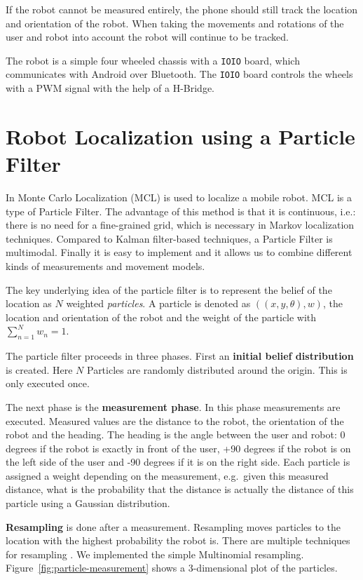 \documentclass[journal]{IEEEtran}
\begin{document}
If the robot cannot be measured entirely, the phone should still track the
location and orientation of the robot. When taking the movements and
rotations of the user and robot into account the robot will continue to be
tracked.

The robot is a simple four wheeled chassis with a \texttt{IOIO} board,
which communicates with Android over Bluetooth. The \texttt{IOIO} board
controls the wheels with a PWM signal with the help of a H-Bridge.

\section{Robot Localization using a Particle Filter}

In \cite{fox1999monte} Monte Carlo Localization (MCL) is used to localize a
mobile robot. MCL is a type of Particle Filter. The advantage of this method is
that it is continuous, i.e.: there is no need for a fine-grained grid, which is
necessary in Markov localization techniques. Compared to Kalman filter-based
techniques, a Particle Filter is multimodal. Finally it is easy to implement
and it allows us to combine different kinds of measurements and movement
models.

The key underlying idea of the particle filter is to represent the belief
of the location as $N$ weighted \emph{particles}. A particle is denoted as
$((x,y,\theta),w)$, the location and orientation of the robot and
the weight of the particle with $\sum_{n=1}^N w_n = 1$.

The particle filter proceeds in three phases. First an \textbf{initial belief
distribution} is created. Here $N$ Particles are randomly distributed around the
origin. This is only executed once.

The next phase is the \textbf{measurement phase}. In this phase measurements
are executed. Measured values are the distance to the robot, the orientation of
the robot and the heading. The heading is the angle between the user and robot:
0 degrees if the robot is exactly in front of the user, +90 degrees if the
robot is on the left side of the user and -90 degrees if it is on the right
side. Each particle is assigned a weight depending on the measurement, e.g.\
given this measured distance, what is the probability that the distance is
actually the distance of this particle using a Gaussian distribution.

\textbf{Resampling} is done after a measurement. Resampling moves particles
to the location with the highest probability the robot is. There are multiple
techniques for resampling \cite{douc2005comparison}. We implemented the
simple Multinomial resampling. Figure~\ref{fig:particle-measurement} shows a
3-dimensional plot of the particles.
\end{document}
